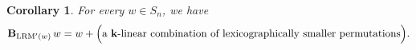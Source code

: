 \documentclass[submission]{FPSAC2026}
\newtheorem{lem}{Lemma}
\newtheorem{corollary}{Corollary}
\newcommand{\id}{\operatorname{id}} %
\newcommand{\kk}{\mathbf{k}} %
\newcommand{\Des}{\operatorname{Des}}
\newcommand{\lex}{\operatorname{lex}}
\newenvironment{proof}[1][Proof]{\noindent\textbf{#1.} }{\ \rule{0.5em}{0.5em}}
\begin{document}






\begin{corollary}
\label{cor.LRM.triang}
For every $w\in S_n$, we have
\[
\mathbf{B}_{\operatorname{LRM}'(w)}\, w
= w + \Bigl(\text{a $\kk$-linear combination of lexicographically smaller permutations}\Bigr).
\]
\end{corollary}
\end{document}
